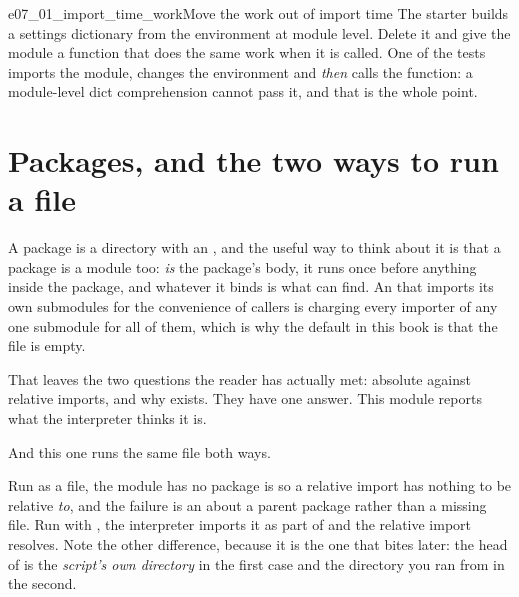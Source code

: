 \begin{exercise}{e07_01_import_time_work}{Move the work out of import time}
The starter builds a settings dictionary from the environment at module
level. Delete it and give the module a  function
that does the same work when it is called. One of the tests imports the
module, changes the environment and \emph{then} calls the function: a
module-level dict comprehension cannot pass it, and that is the whole point.
\end{exercise}

\section{Packages, and the two ways to run a file}
\label{sec:packages}

A package is a directory with an , and the useful way
to think about it is that a package is a module too: 
\emph{is} the package's body, it runs once before anything inside the
package, and whatever it binds is what  can find.
An  that imports its own submodules for the
convenience of callers is charging every importer of any one submodule for
all of them, which is why the default in this book is that the file is
empty.

That leaves the two questions the reader has actually met: absolute against
relative imports, and why  exists. They have one answer.
This module reports what the interpreter thinks it is.


\noindent
And this one runs the same file both ways.



\noindent
Run as a file, the module has no package \dash{}  is
 \dash{} so a relative import has nothing to be relative
\emph{to}, and the failure is an  about a parent package
rather than a missing file. Run with , the interpreter imports it
as part of  and the relative import resolves. Note the other
difference, because it is the one that bites later: the head of
 is the \emph{script's own directory} in the first case and
the directory you ran from in the second.

